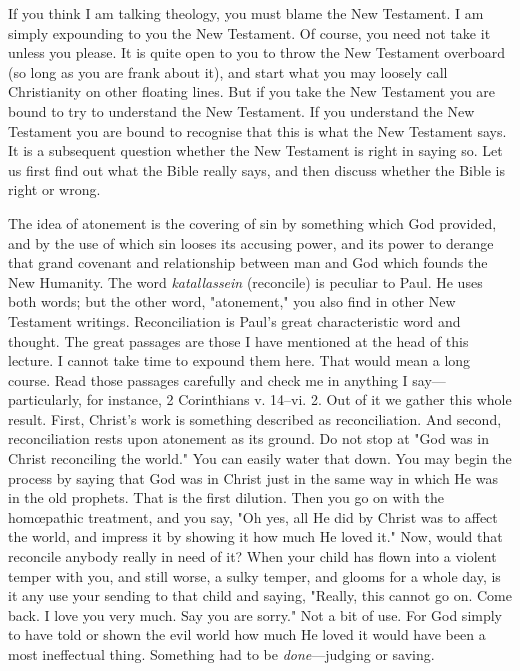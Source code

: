 \documentclass[12pt,letterpaper,oneside]{book}
\begin{document}
If you think I am talking theology, you must 
blame the New Testament. I am simply expounding 
to you the New Testament. Of course, 
you need not take it unless you please. It is 
quite open to you to throw the New Testament 
overboard (so long as you are frank 
about it), and start what you may loosely call 
Christianity on other floating lines. But if you 
take the New Testament you are bound to try to 
understand the New Testament. If you understand 
the New Testament you are bound to 
recognise that this is what the New Testament 
says. It is a subsequent question whether the 
New Testament is right in saying so. Let us 
first find out what the Bible really says, and then 
discuss whether the Bible is right or wrong. 

The idea of atonement is the covering of sin 
by something which God provided, and by the 
use of which sin looses its accusing power, and 
its power to derange that grand covenant and 
relationship between man and God which founds 
the New Humanity. The word \textit{katallassein} (reconcile) 
is peculiar to Paul. He uses both words; 
but the other word, "atonement," you also find in 
other New Testament writings. Reconciliation 
is Paul's great characteristic word and thought. 
The great passages are those I have mentioned 
at the head of this lecture. I cannot take time 
to expound them here. That would mean a long 
course. Read those passages carefully and 
check me in anything I say---particularly, for 
instance, 2 Corinthians v. 14--vi. 2. Out of it we 
gather this whole result. First, Christ's work 
is something described as reconciliation. And 
second, reconciliation rests upon atonement as 
its ground. Do not stop at "God was in Christ 
reconciling the world." You can easily water 
that down. You may begin the process by 
saying that God was in Christ just in the same 
way in which He was in the old prophets. That 
is the first dilution. Then you go on with the 
hom{\oe}pathic treatment, and you say, "Oh yes, 
all He did by Christ was to affect the world, and 
impress it by showing it how much He loved it." 
Now, would that reconcile anybody really in 
need of it? When your child has flown into a 
violent temper with you, and still worse, a sulky 
temper, and glooms for a whole day, is it any 
use your sending to that child and saying, 
"Really, this cannot go on. Come back. I love 
you very much. Say you are sorry." Not 
a bit of use. For God simply to have told 
or shown the evil world how much He loved 
it would have been a most ineffectual thing. 
Something had to be \textit{done}---judging or saving. 
\end{document}
